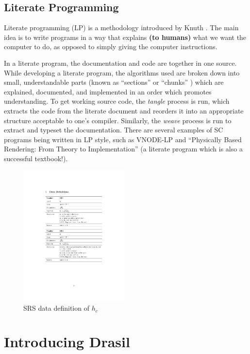 \documentclass{sig-alternate-05-2015}
\newcommand{\lss}{Drasil}
\begin{document}
\subsection{Literate Programming} \label{ssec:literate}

Literate programming (LP) is a methodology introduced by Knuth
\cite{Knuth1984}. The main idea is to write programs in a way that explains 
{\bf (to humans)} what we want the computer to do, as opposed to simply giving
the computer instructions.

In a literate program, the documentation and code are together in one source.
While developing a literate program, the algorithms used are broken down into
small, understandable parts (known as ``sections'' \cite{Knuth1984} or
``chunks'' \cite{JohnsonAndJohnson1997}) which are explained, documented, and
implemented in an order which promotes understanding. To get working source
code, the \textit{tangle} process is run, which extracts the code from the
literate document and reorders it into an appropriate structure acceptable
to one's compiler.  Similarly, the \textit{weave} process is run to extract and
typeset the documentation.
There are several examples of SC programs being written in LP style, such as
VNODE-LP \cite{Nedialkov2006} and ``Physically Based Rendering: From Theory to
Implementation'' \cite{PharrAndHumphreys2004} (a literate program which is also
a successful textbook!).

\begin{figure}
\includegraphics[width=0.49\textwidth]{h_c.pdf}
\caption{SRS data definition of $h_c$}
\label{fig:h_c}
\end{figure}	

\section{Introducing \lss} \label{sec:lss}
\end{document}
